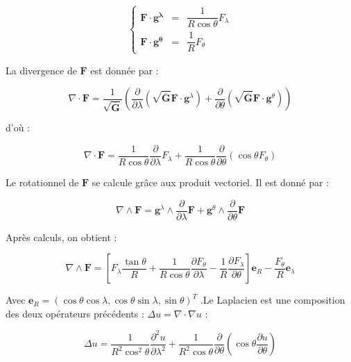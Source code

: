 $$
\left\lbrace 
\begin{array}{rcl}
\mathbf{F} \cdot \mathbf{g^{\lambda}} & = & \dfrac{1}{R \cos \theta} F_{\lambda} \\
\mathbf{F} \cdot \mathbf{g^{\theta}} & = & \dfrac{1}{R} F_{\theta}
\end{array}
\right.
$$

La divergence de $\mathbf{F}$ est donnée par :

\begin{equation}
\nabla \cdot \mathbf{F} = \dfrac{1}{\sqrt{\overline{\mathbf{G}}}} \left( \dfrac{\partial}{\partial \lambda} \left( \sqrt{\overline{\mathbf{G}}} \mathbf{F} \cdot \mathbf{g}^{\lambda}  \right) +  \dfrac{\partial}{\partial \theta} \left( \sqrt{\overline{\mathbf{G}}} \mathbf{F} \cdot \mathbf{g}^{\theta}  \right)  \right)
\end{equation}

d'où :

\begin{equation}\label{divergence_lonlat}
\nabla \cdot \mathbf{F} = \dfrac{1}{R \cos \theta} \dfrac{\partial}{\partial \lambda}  F_{\lambda} + \dfrac{1}{R \cos \theta} \dfrac{\partial}{\partial \theta} \left( \cos \theta F_{\theta} \right)
\end{equation}

Le rotationnel de $\mathbf{F}$ se calcule grâce aux produit vectoriel. Il est donné par :

\begin{equation}
\nabla \wedge \mathbf{F} = \mathbf{g}^{\lambda} \wedge \dfrac{\partial}{\partial \lambda}\mathbf{F} + \mathbf{g}^{\theta} \wedge \dfrac{\partial}{\partial \theta}\mathbf{F} 
\end{equation}

Après calculs, on obtient :

\begin{equation}\label{rotationnel_lonlat}
\nabla \wedge \mathbf{F} = \left[ F_{\lambda} \dfrac{\tan \theta}{R} + \dfrac{1}{R \cos \theta} \dfrac{\partial F_{\theta}}{\partial \lambda} - \dfrac{1}{R} \dfrac{\partial F_{\lambda}}{\partial \theta} \right] \mathbf{e}_R - \dfrac{F_{\theta}}{R} \mathbf{e}_{\lambda}
\end{equation}


Avec $\mathbf{e}_{R} = \left( \cos \theta \cos \lambda, \cos \theta \sin \lambda, \sin \theta \right)^T$ .Le Laplacien est une composition des deux opérateurs précédents : $\Delta u = \nabla \cdot \nabla u$ :

\begin{equation}\label{laplacien_lonlat}
\Delta u = \dfrac{1}{R^2 \cos^2 \theta} \dfrac{\partial^2 u }{\partial \lambda^2} + \dfrac{1}{R^2 \cos \theta} \dfrac{\partial}{\partial \theta} \left( \cos \theta \dfrac{\partial u}{\partial \theta} \right)
\end{equation}

